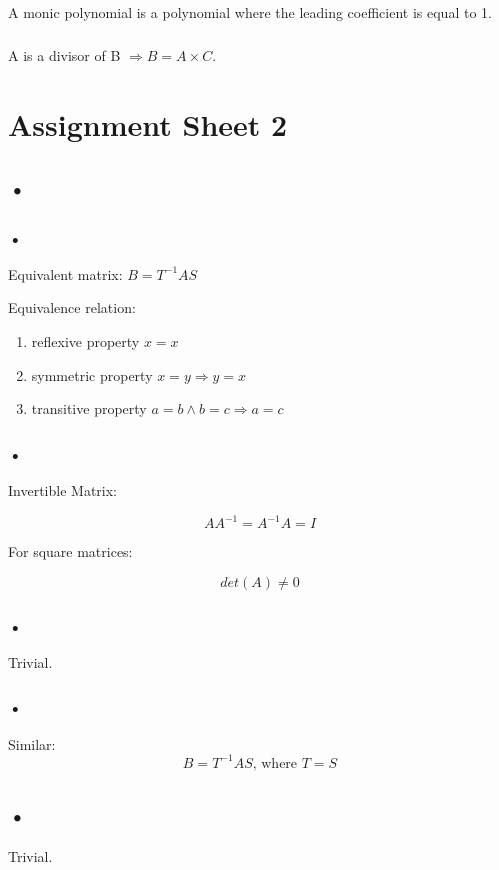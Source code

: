 \documentclass{report}
\begin{document}
\section{}

\subsection{}
A monic polynomial is a polynomial where the leading coefficient is equal to 1.
\subsection{}
A is a divisor of B $\Rightarrow B=A\times C$.

\chapter{Assignment Sheet 2}
\section{•}
\subsection{•}
Equivalent matrix:
$B=T^{-1}AS$

Equivalence relation:
\begin{enumerate}
\item reflexive property $x=x$
\item symmetric property $x=y \Rightarrow y=x$
\item transitive property $a=b \land b=c \Rightarrow a=c$
\end{enumerate}
\subsection{•}
Invertible Matrix:

$$AA^{-1}=A^{-1}A=I$$

For square matrices:

$$det(A) \neq 0$$
\subsection{•}
Trivial.
\subsection{•}
Similar:
$$B=T^{-1}AS\textrm{, where }T=S$$

\section{•}
Trivial.
\end{document}
